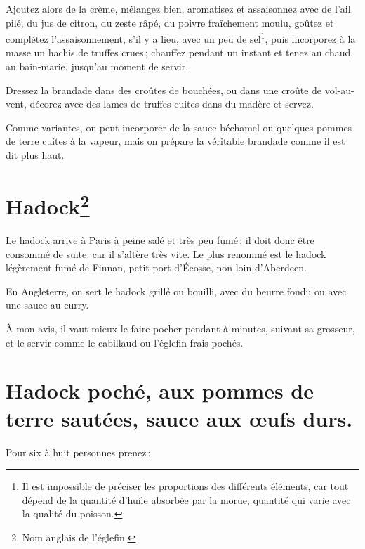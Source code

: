 Ajoutez alors de la crème, mélangez bien, aromatisez et assaisonnez avec de
l'ail pilé, du jus de citron, du zeste râpé, du poivre fraîchement moulu,
goûtez et complétez l’assaisonnement, s'il y a lieu, avec un peu de
sel\footnote{Il est impossible de préciser les proportions des différents
éléments, car tout dépend de la quantité d'huile absorbée par la morue,
quantité qui varie avec la qualité du poisson.}, puis incorporez à la masse un
hachis de truffes crues ; chauffez pendant un instant et tenez au chaud, au
bain-marie, jusqu'au moment de servir.

Dressez la brandade dans des croûtes de bouchées, ou dans une croûte de
vol-au-vent, décorez avec des lames de truffes cuites dans du madère et servez.

\sk

Comme variantes, on peut incorporer de la sauce béchamel ou quelques pommes de
terre cuites à la vapeur, mais on prépare la véritable brandade comme il est
dit plus haut.

\section*{\centering Hadock\footnote{Nom anglais de l'églefin.}}

Le hadock arrive à Paris à peine salé et très peu fumé ; il doit donc être
consommé de suite, car il s'altère très vite. Le plus renommé est le hadock
légèrement fumé de Finnan, petit port d'Écosse, non loin d'Aberdeen.

En Angleterre, on sert le hadock grillé ou bouilli, avec du beurre fondu ou
avec une sauce au curry.

À mon avis, il vaut mieux le faire pocher pendant {\mmm} à {\mmm} minutes, suivant sa
grosseur, et le servir comme le cabillaud ou l'églefin frais pochés.

\section*{\centering Hadock poché, aux pommes de terre sautées, sauce aux œufs durs.}

Pour six à huit personnes prenez :

\medskip

